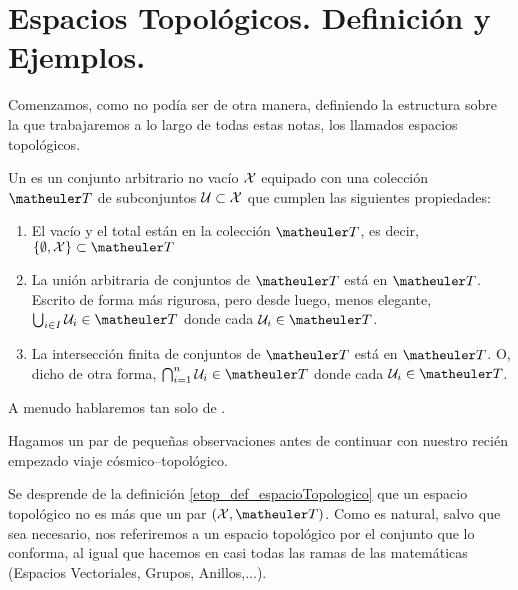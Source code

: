 \section{Espacios Topológicos. Definición y Ejemplos.}
\label{etop_definicionEjemplos}
Comenzamos, como no podía ser de otra manera, definiendo la estructura sobre la que trabajaremos a lo largo de todas estas notas, los llamados espacios topológicos.
\begin{defi}[Espacio Topológico]
	\label{etop_def_espacioTopologico}
	Un \tb{} es un conjunto arbitrario no vacío $\mathcal{X}$ equipado con una colección $\T$ de subconjuntos $\mathcal{U}\subset\mathcal{X}$ que cumplen las siguientes propiedades:
	\begin{enumerate}
		\item[\tb{T1}] El vacío y el total están en la colección $\T$, es decir, $\{\emptyset, \X\} \subset \T$
		\item[\tb{T2}] La unión arbitraria de conjuntos de $\T$ está en $\T$. Escrito de forma más rigurosa, pero desde luego, menos elegante, 
		$\bigcup_{i\in I}\U_i\in\T$ donde cada $\U_i\in\T$.
		\item[\tb{T3}] La intersección finita de conjuntos de $\T$ está en $\T$. O, dicho de otra forma, $\bigcap_{i=1}^{n}\U_i\in\T$ donde cada $\U_i\in\T$.
	\end{enumerate}
	
	A menudo hablaremos tan solo de .
\end{defi}
Hagamos un par de pequeñas observaciones antes de continuar con nuestro recién empezado viaje cósmico--topológico.
\begin{obs}[Sutilezas]
	\label{etop_obs_sutilezas}
	Se desprende de la definición \ref{etop_def_espacioTopologico} que un espacio topológico no es más que un par $(\X, \T)$. Como es natural, salvo que sea necesario, nos referiremos a un espacio topológico por el conjunto que lo conforma, al igual que hacemos en casi todas las ramas de las matemáticas (Espacios Vectoriales, Grupos, Anillos,...).
\end{obs}

